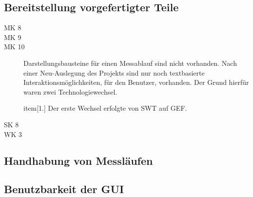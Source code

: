 \documentclass[parskip=full]{scrartcl}
\begin{document}
\subsection {Bereitstellung vorgefertigter Teile}

\begin{description}
\item[MK 8]
\item[MK 9] 
\item[MK 10] Darstellungsbausteine für einen Messablauf sind nicht vorhanden. Nach einer Neu-Auslegung des Projekts sind nur noch textbasierte Interaktionsmöglichkeiten, für den Benutzer, vorhanden. Der Grund hierfür waren zwei Technologiewechsel.
\begin{description}
	item[1.] Der erste Wechsel erfolgte von \gls{SWT} auf \gls{GEF}.
\end{description}
\item[SK 8] 
\item[WK 3] 
\end{description}

\subsection{Handhabung von Messläufen}

\subsection {Benutzbarkeit der GUI}
\end{document}

